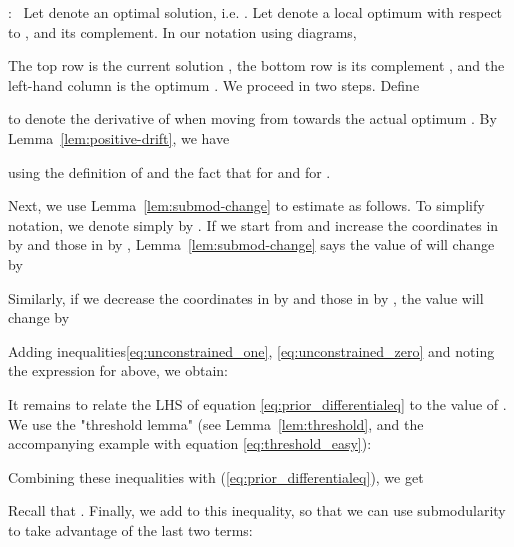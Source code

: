 \documentclass{article}[11pt]
\renewenvironment{proof}{\noindent{\bf Proof}:~}{\\}
\begin{document}
\begin{proof}
Let  denote an optimal solution, i.e. .
Let  denote a local optimum with respect to , and  its complement.
In our notation using diagrams,

The top row is the current solution , the bottom row is its complement ,
and the left-hand column is the optimum .
We proceed in two steps. Define 

to denote the derivative of  when moving from  towards the actual optimum .
By Lemma~\ref{lem:positive-drift}, we have

using the definition of  and the fact that
 for  and
 for .


Next, we use Lemma~\ref{lem:submod-change} to estimate  as follows.
To simplify notation, we denote  simply by . 
If we start from  and increase the coordinates in  by 
and those in  by , Lemma~\ref{lem:submod-change} says
the value of  will change by 

Similarly, if we decrease the coordinates in  by  and
those in  by , the value will change by

Adding inequalities\eqref{eq:unconstrained_one}, \eqref{eq:unconstrained_zero}
and noting the expression for  above, we obtain:

It remains to  relate the LHS of equation \eqref{eq:prior_differentialeq} to the value of . We use the "threshold lemma" (see Lemma~\ref{lem:threshold}, and the accompanying example with equation \eqref{eq:threshold_easy}):


Combining these inequalities with (\ref{eq:prior_differentialeq}), we get

Recall that . Finally, we add  to this inequality,
so that we can use submodularity to take advantage
of the last two terms: 
\end{proof}
\end{document}
